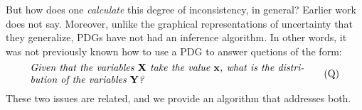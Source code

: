 \documentclass[twoside]{article}
\begin{document}
But how does one \emph{calculate} this degree of inconsistency, in general?
Earlier work does not say. 
%
Moreover, unlike the graphical representations of uncertainty that they
generalize, 
PDGs have not had an inference algorithm.
In other words, it was not previously known how to use a PDG
to answer quetions of the form:
\begin{equation}
    \begin{minipage}{0.80\linewidth}
    \it Given that the variables $\mat X$ take the value $\mat x$, 
    what is the distribution of the variables $\mat Y$? 
    \end{minipage}
    \tag{Q}
    \label{q:inf}
\end{equation}
%
These two issues
are related, and we provide an algorithm
that addresses both.
\end{document}
